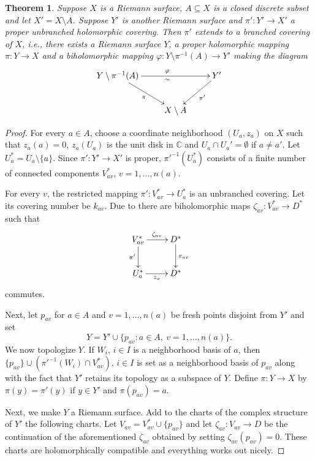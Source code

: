 \documentclass[12pt]{article}
\theoremstyle{thmstyle}
\newtheorem{theorem}{Theorem}[section]
\theoremstyle{defstyle}
\newcommand{\bbC}{\mathbb{C}}
\begin{document}
\begin{theorem}
    Suppose $X$ is a Riemann surface, $A\subseteq X$ is a closed discrete subset and let $X'= X\setminus A$. Suppose $Y'$ is another Riemann surface and $\pi': Y'\to X'$ a proper \emph{unbranched} holomorphic covering. Then $\pi'$ extends to a branched covering of $X$, i.e., there exists a Riemann surface $Y$, a proper holomorphic mapping $\pi: Y\to X$ and a biholomorphic mapping $\varphi: Y\setminus\pi^{-1}(A)\to Y'$ making the diagram 
    \begin{equation*}
        \xymatrix {
            Y\setminus\pi^{-1}(A)\ar[rr]^\varphi_\sim\ar[rd]_\pi & & Y'\ar[ld]^-{\pi'}\\
            & X\setminus A
        }
    \end{equation*}
\end{theorem}
\begin{proof}
    For every $a\in A$, choose a coordinate neighborhood $(U_a, z_a)$ on $X$ such that $z_a(a) = 0$, $z_a(U_a)$ is the unit disk in $\bbC$ and $U_a\cap U_a' = \emptyset$ if $a\ne a'$. Let $U_a^\ast = U_a\setminus\{a\}$. Since $\pi': Y'\to X'$ is proper, $\pi'^{-1}(U_a^\ast)$ consists of a finite number of connected components $V^\ast_{av}$, $v = 1,\dots, n(a)$. 
    
    For every $v$, the restricted mapping $\pi': V^\ast_{av}\to U_a^\ast$ is an unbranched covering. Let its covering number be $k_{av}$. Due to  there are biholomorphic maps $\zeta_{av}: V^\ast_{av}\to D^\ast$ such that 
    \begin{equation*}
        \xymatrix {
        V^\ast_{av}\ar[r]^{\zeta_{av}}\ar[d]_{\pi'} & D^\ast\ar[d]^{\pi_{av}}\\
        U_a^\ast\ar[r]_{z_a} & D^\ast
        }
    \end{equation*}
    commutes.

    Next, let $p_{av}$ for $a\in A$ and $v = 1,\dots, n(a)$ be fresh points disjoint from $Y'$ and set 
    \begin{equation*}
        Y = Y'\cup\{p_{av}\colon a\in A,~v = 1,\dots, n(a)\}.
    \end{equation*}
    We now topologize $Y$. If $W_i$, $i\in I$ is a neighborhood basis of $a$, then $\{p_{av}\}\cup\left(\pi'^{-1}(W_i)\cap V^\ast_{av}\right)$, $i\in I$ is set as a neighborhood basis of $p_{av}$ along with the fact that $Y'$ retains its topology as a subspace of $Y$. Define $\pi: Y\to X$ by $\pi(y) = \pi'(y)$ if $y\in Y'$ and $\pi(p_{av}) = a$. 

    Next, we make $Y$ a Riemann surface. Add to the charts of the complex structure of $Y'$ the following charts. Let $V_{av} = V^\ast_{av}\cup\{p_{av}\}$ and let $\zeta_{av}: V_{av}\to D$ be the continuation of the aforementioned $\zeta_{av}$ obtained by setting $\zeta_{av}(p_{av}) = 0$. These charts are holomorphically compatible and everything works out nicely.
\end{proof}
\end{document}
